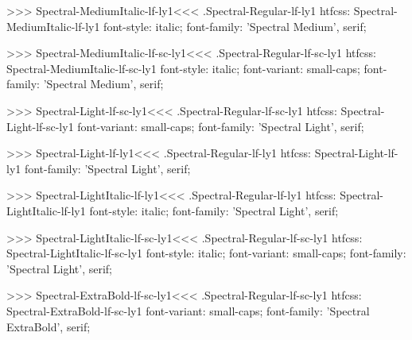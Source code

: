 >>>
\<Spectral-MediumItalic-lf-ly1\><<<
.Spectral-Regular-lf-ly1
htfcss:  Spectral-MediumItalic-lf-ly1  font-style: italic; font-family: 'Spectral Medium', serif;

>>>
\<Spectral-MediumItalic-lf-sc-ly1\><<<
.Spectral-Regular-lf-sc-ly1
htfcss:  Spectral-MediumItalic-lf-sc-ly1  font-style: italic; font-variant: small-caps; font-family: 'Spectral Medium', serif;

>>>
\<Spectral-Light-lf-sc-ly1\><<<
.Spectral-Regular-lf-sc-ly1
htfcss:  Spectral-Light-lf-sc-ly1  font-variant: small-caps; font-family: 'Spectral Light', serif;

>>>
\<Spectral-Light-lf-ly1\><<<
.Spectral-Regular-lf-ly1
htfcss:  Spectral-Light-lf-ly1  font-family: 'Spectral Light', serif;

>>>
\<Spectral-LightItalic-lf-ly1\><<<
.Spectral-Regular-lf-ly1
htfcss:  Spectral-LightItalic-lf-ly1  font-style: italic; font-family: 'Spectral Light', serif;

>>>
\<Spectral-LightItalic-lf-sc-ly1\><<<
.Spectral-Regular-lf-sc-ly1
htfcss:  Spectral-LightItalic-lf-sc-ly1  font-style: italic; font-variant: small-caps; font-family: 'Spectral Light', serif;

>>>
\<Spectral-ExtraBold-lf-sc-ly1\><<<
.Spectral-Regular-lf-sc-ly1
htfcss:  Spectral-ExtraBold-lf-sc-ly1  font-variant: small-caps; font-family: 'Spectral ExtraBold', serif;


